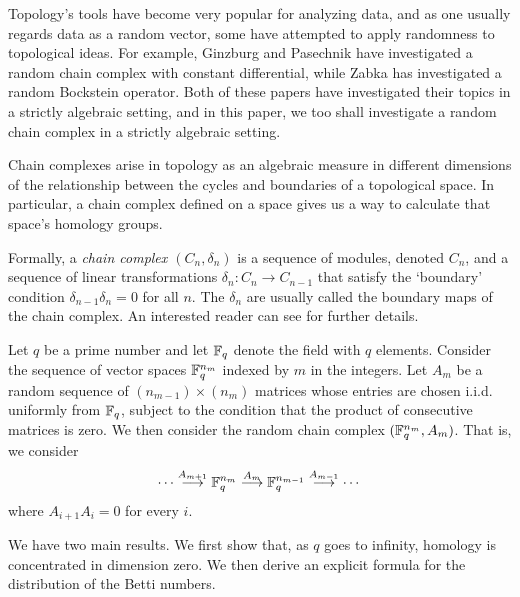 Topology's tools have become very popular for analyzing data, and as one usually regards data as a random vector, some have attempted to apply randomness to topological ideas.  For example, Ginzburg and Pasechnik
\cite{ginzburg2017random} have investigated a random chain complex
with constant differential, while Zabka \cite{zabka2018random} has investigated
a random Bockstein operator.  Both of these papers have investigated their
topics in a strictly algebraic setting, and in this paper, we too shall
investigate a random chain complex in a strictly algebraic setting.

Chain complexes arise in topology as an algebraic measure in different
dimensions of the relationship between the cycles and boundaries of a
topological space. In particular, a chain complex defined on a space gives us a
way to calculate that space's homology groups.

Formally, a {\em chain complex $(C_n, \delta_n)$ } is a sequence of modules, denoted $C_n$, and a sequence of linear transformations $\delta_n : C_n \to C_{n-1}$ that satisfy the `boundary' condition
$\delta_{n-1}\delta_n = 0$ for all $n$. The $\delta_n$ are usually called the
boundary maps of the chain complex. An interested reader can see \cite{hatcher2002algebraic} for further details.

Let $q$ be a prime number and let $\mathbb{F}_q$ denote the field with $q$ elements. Consider the sequence of vector spaces $\mathbb{F}_q^{n_m}$ indexed by $m$ in the integers.  Let $A_m$ be a random sequence of $(n_{m-1})\times (n_m)$ matrices whose entries are chosen i.i.d. uniformly from $\mathbb{F}_q$, subject to the condition that the product of consecutive matrices is zero.  We then consider the random chain complex $(\mathbb{F}_q^{n_m},A_m)$. That is, we consider
\[
  \cdots \stackrel{A_{m+1}}{\longrightarrow} \mathbb{F}_q^{n_m} \stackrel{A_m}{\longrightarrow} \mathbb{F}_q^{n_{m-1}} 
  \stackrel{A_{m-1}}{\longrightarrow} \cdots 
\]
where $A_{i+1}A_i=0$ for every $i$. 

We have two main results. We first show that, as $q$ goes to infinity, homology is concentrated in dimension zero.  We then derive an explicit formula for the distribution of the Betti numbers.